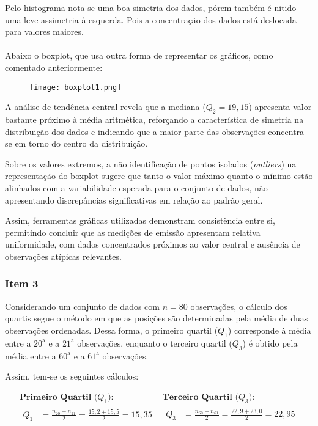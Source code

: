 \documentclass[a4paper,11pt]{article}
\begin{document}
Pelo histograma nota-se uma boa simetria dos dados, pórem também é nitido uma leve assimetria à esquerda. Pois a concentração dos dados está deslocada para valores maiores.
\\
\\
Abaixo o boxplot, que usa outra forma de representar os gráficos, como comentado anteriormente:
\newpage
\begin{figure}
    \centering
    \texttt{[image: boxplot1.png]}
\end{figure}

A análise de tendência central revela que a mediana (\(Q_2 = 19,15\)) apresenta valor bastante próximo à média aritmética, reforçando a característica de simetria na distribuição dos dados e indicando que a maior parte das observações concentra-se em torno do centro da distribuição.

Sobre os valores extremos, a não identificação de pontos isolados (\textit{outliers}) na representação do boxplot sugere que tanto o valor máximo quanto o mínimo estão alinhados com a variabilidade esperada para o conjunto de dados, não apresentando discrepâncias significativas em relação ao padrão geral.

Assim, ferramentas gráficas utilizadas demonstram consistência entre si, permitindo concluir que as medições de emissão apresentam relativa uniformidade, com dados concentrados próximos ao valor central e ausência de observações atípicas relevantes.
\\

\subsubsection{Item 3}
Considerando um conjunto de dados com $n=80$ observações, o cálculo dos quartis segue o método em que as posições são determinadas pela média de duas observações ordenadas. Dessa forma, o primeiro quartil ($Q_1$) corresponde à média entre a $20^{\text{a}}$ e a $21^{\text{a}}$ observações, enquanto o terceiro quartil ($Q_3$) é obtido pela média entre a $60^{\text{a}}$ e a $61^{\text{a}}$ observações.

Assim, tem-se os seguintes cálculos:

\[
\begin{array}{ll}
\textbf{Primeiro Quartil ($Q_1$):} & \textbf{Terceiro Quartil ($Q_3$):} \\
\begin{aligned}
Q_1 &= \frac{n_{20} + n_{21}}{2} = \frac{15{,}2 + 15{,}5}{2} = 15{,}35
\end{aligned}
&
\begin{aligned}
Q_3 &= \frac{n_{60} + n_{61}}{2} = \frac{22{,}9 + 23{,}0}{2} = 22{,}95
\end{aligned}
\end{array}
\]
\end{document}
